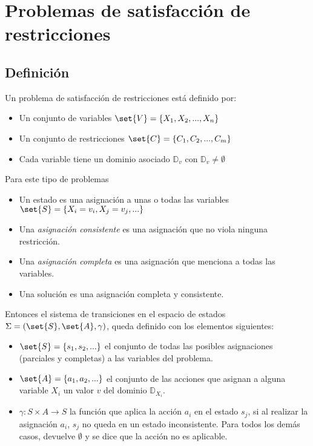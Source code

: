 \section{Problemas de satisfacción de restricciones}

\subsection{Definición}

\begin{definition}
Un problema de satisfacción de restricciones está definido por:
 \begin{itemize}
  \item Un conjunto de variables $\set{V} = \{X_1,X_2,...,X_n\}$
  \item Un conjunto de restricciones $\set{C} = \{C_1,C_2,...,C_m\}$
  \item Cada variable tiene un dominio asociado $\mathbb{D}_v$ con $\mathbb{D}_v \neq \emptyset$
 \end{itemize}
\end{definition}

Para este tipo de problemas 
\begin{itemize}
\item Un estado es una asignación a unas o todas las variables $\set{S} = \{X_i = v_i, X_j=v_j,...\}$
\item Una \emph{asignación consistente} es una asignación que no viola ninguna restricción.
\item Una \emph{asignación completa} es una asignación que menciona a todas las variables.
\item Una solución es una asignación completa y consistente.
\end{itemize}

Entonces el sistema de transiciones en el espacio de estados $\Sigma=(\set{S},\set{A},\gamma)$, queda definido con los elementos siguientes:
\begin{itemize}
 \item $\set{S}= \{s_1,s_2,...\}$ el conjunto de todas las posibles asignaciones (parciales y completas) a las variables del problema.
 \item $\set{A}= \{a_1,a_2,...\}$ el conjunto de las acciones que asignan a alguna variable $X_i$ un valor $v$ del dominio $\mathbb{D}_{X_i}$.
 \item $\gamma: S \times A \rightarrow S$ la función que aplica la acción $a_i$ en el estado $s_j$, si al realizar la asignación $a_i$, $s_j$ no queda en un estado inconsistente.  Para todos los demás casos, devuelve $\emptyset$ y se dice que la acción no es aplicable.
\end{itemize}

